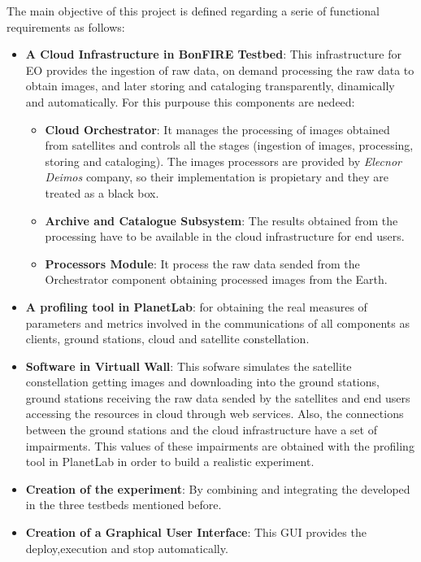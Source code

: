 The main objective of this project is defined regarding a serie of functional
requirements as follows:
\begin{itemize}
  
\item {\textbf{A Cloud Infrastructure in BonFIRE Testbed}: This
  infrastructure for \ac{EO} provides the ingestion of raw data, on demand processing the raw
  data to obtain images, and later storing and cataloging transparently,
  dinamically and automatically. For this purpouse this components are nedeed:
}
\begin{itemize}

\item{\textbf{Cloud Orchestrator}: It manages the
  processing of images obtained from satellites and controls all the stages
  (ingestion of images, processing, storing and cataloging). The images
  processors are provided by \emph{Elecnor Deimos} company, so their implementation is propietary and they are treated as a black box.}
\item {\textbf{Archive and Catalogue Subsystem}: The
  results obtained from the processing have to be available in the cloud
  infrastructure for end users.}
\item{\textbf{Processors Module}: It process the raw data sended from
  the Orchestrator component obtaining processed images from the Earth.}  
\end{itemize}
\item {\textbf{A profiling tool in PlanetLab}: for obtaining the real measures of
  parameters and metrics involved in the communications of all components as
  clients, ground stations, cloud and satellite constellation.}


\item {\textbf{Software in Virtuall Wall}: This sofware simulates the satellite
  constellation getting images and downloading into the ground stations, ground
  stations receiving the raw data sended by the satellites and end users
  accessing the resources in cloud through web services. Also, the connections
  between the ground stations and the cloud infrastructure have a set of
  impairments. This values of these impairments are obtained with the profiling tool in
  PlanetLab in order to build a  realistic experiment.}

\item {\textbf{Creation of the experiment}: By combining and integrating
  the developed in the three testbeds mentioned before.}

\item {\textbf{Creation of a Graphical User Interface}: This \ac{GUI} provides
  the deploy,execution and stop automatically.} 


\end{itemize}
